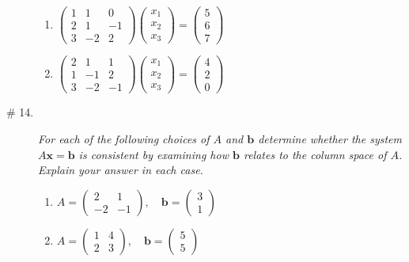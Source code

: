 \documentclass[8pt]{article} %
\begin{document}
\begin{description}
{\begin{enumerate}[label=(\alph*)]
		\item $\begin{pmatrix}1&1&0\\2&1&-1\\3&-2&2\end{pmatrix}\begin{pmatrix}x_1\\x_2\\x_3
			\end{pmatrix}=\begin{pmatrix}5\\6\\7\end{pmatrix}$
		\item $\begin{pmatrix}2&1&1\\1&-1&2\\3&-2&-1\end{pmatrix}\begin{pmatrix}x_1\\x_2\\x_3
			\end{pmatrix}=\begin{pmatrix}4\\2\\0\end{pmatrix}$
	\end{enumerate}
	}
\item[\# 14.]{
	\renewcommand{\b}{\mathbf{b}}
	\newcommand{\x}{\mathbf{x}}
	{\it For each of the following choices of $A$ and $\b$ determine whether the system $A\x=\b$ is consistent by examining how $\b$ relates
	to the column space of $A$. Explain your answer in each case.}
	\begin{multicols}{2}\begin{enumerate}[label=(\alph*)]
		\item $A=\begin{pmatrix}2&1\\-2&-1\end{pmatrix},\quad\b=\begin{pmatrix}3\\1\end{pmatrix}$
		\item $A=\begin{pmatrix}1&4\\2&3\end{pmatrix},\quad\b=\begin{pmatrix}5\\5\end{pmatrix}$
	\end{enumerate}\end{multicols}
}
\end{description}
\end{document}
